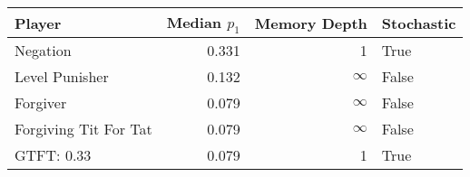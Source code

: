 \begin{tabular}{lrrl}
\toprule
                Player &  Median $p_1$ &  Memory Depth & Stochastic \\
\midrule
              Negation &         0.331 &             1 &       True \\
        Level Punisher &         0.132 &            \(\infty\) &      False \\
              Forgiver &         0.079 &            \(\infty\) &      False \\
 Forgiving Tit For Tat &         0.079 &            \(\infty\) &      False \\
            GTFT: 0.33 &         0.079 &             1 &       True \\
\bottomrule
\end{tabular}
